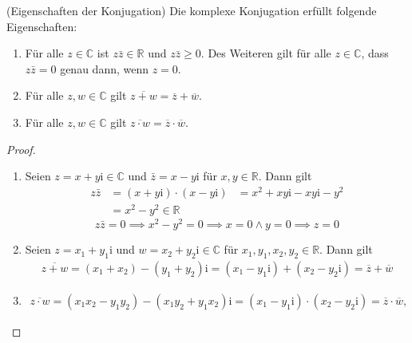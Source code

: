 \documentclass[../Analysis1_script.tex]{subfiles}
\begin{document}
\begin{lemma}{(Eigenschaften der Konjugation)}
	Die komplexe Konjugation erfüllt folgende Eigenschaften:
	\begin{enumerate}
    	\item Für alle $z \in \mathbb {C}$ ist $z\bar {z}\in \mathbb {R}$ und $z \bar {z} \geq 0$. Des Weiteren gilt für alle $z \in \mathbb {C}$, dass $z\bar {z} = 0$ genau dann, wenn $z=0$.
    	\item Für alle $z,w \in \mathbb {C}$ gilt $\overline {z+w}=\overline {z}+\overline {w}$.
    	\item Für alle $z,w \in \mathbb {C}$ gilt $\overline {z\cdot w}=\overline {z}\cdot \overline {w}$.
    \end{enumerate}
\end{lemma}

\begin{proof}
	\begin{enumerate}
		\item Seien $z = x + y\mathrm{i} \in \mathbb{C}$ und $\bar{z} = x - y\mathrm{i}$ für $x, y \in \mathbb{R}$. Dann gilt
		\begin{equation}
		\begin{aligned}
			z\bar{z} &= (x + y\mathrm{i}) \cdot (x - y\mathrm{i}) &= x^2 + xy\mathrm{i} - xy\mathrm{i} - y^2\\ &= x^2 - y^2 \in \mathbb{R}
		\end{aligned}
		\end{equation}
		\begin{equation}
			z\bar{z} = 0 \implies x^2 - y^2 = 0 \implies x = 0 \wedge y = 0 \implies z = 0
		\end{equation}
		\item Seien $z=x_1+y_1\mathrm {i}$ und $w =x_2+y_2\mathrm {i}\in \mathbb {C}$ für $x_1,y_1,x_2,y_2 \in \mathbb {R}$. Dann gilt
		\begin{equation}
		\begin{aligned}
			\overline {z+w} = (x_1+x_2) - (y_1+y_2) \mathrm {i} = (x_1-y_1\mathrm {i}) + (x_2-y_2\mathrm {i}) =\overline {z}+\overline {w}
		\end{aligned}
		\end{equation}
		\item 
		\begin{equation}
		\begin{aligned}
			\overline {z\cdot w} = (x_1x_2-y_1y_2) - (x_1y_2+y_1x_2)\mathrm {i} = (x_1-y_1\mathrm {i}) \cdot (x_2-y_2\mathrm {i}) =\overline {z}\cdot \overline {w},
		\end{aligned}
		\end{equation}   
	\end{enumerate}
\end{proof}
\end{document}
